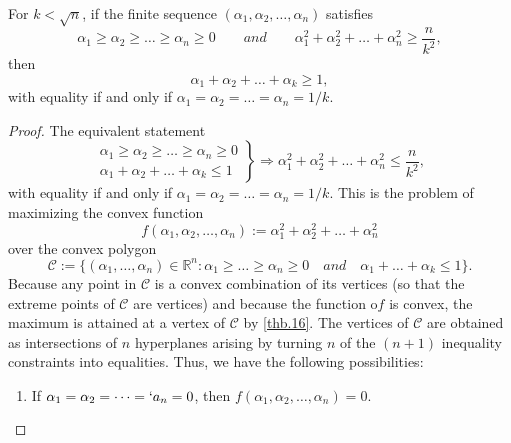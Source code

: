 \begin{lemma}
    For $k<\sqrt{n}$, if the finite sequence $(\alpha_1,\alpha_2,\dots,\alpha_n)$ satisfies 
    \begin{equation*}
        \alpha_1 \geq \alpha_2 \geq \dots \geq \alpha_n \geq 0 \qquad and \qquad \alpha_1^2 + \alpha_2^2 + \dots + \alpha_n^2 \geq \dfrac{n}{k^2},
    \end{equation*}
    then 
    \begin{equation*}
        \alpha_1 + \alpha_2 + \dots + \alpha_k \geq 1,
    \end{equation*}
    with equality if and only if $\alpha_1 = \alpha_2 = \dots = \alpha_n = 1/k$.
    \label{lm1.9}
\end{lemma}
\begin{proof}
    The equivalent statement
    \begin{equation*}
        \left.
        \begin{array}{c}
            \alpha_1 \geq \alpha_2 \geq \dots \geq \alpha_n \geq 0\\
            \alpha_1 + \alpha_2 + \dots +\alpha_k \leq 1
        \end{array}
    \right\} \Longrightarrow \alpha^2_1 + \alpha_2^2 + \dots + \alpha_n^2 \leq \dfrac{n}{k^2},
    \end{equation*}
    with equality if and only if $\alpha_1 = \alpha_2 = \dots = \alpha_n = 1/k$. This is the problem of maximizing the convex function
    \begin{equation*}
        f(\alpha_1, \alpha_2, \dots, \alpha_n) := \alpha_1^2 + \alpha_2^2 + \dots + \alpha_n^2
    \end{equation*}
    over the convex polygon
    \begin{equation*}
        \mathcal{C} := \{(\alpha_1,\dots,\alpha_n) \in \mathbb{R}^n : \alpha_1 \geq \dots \geq \alpha_n \geq 0 \quad and \quad \alpha_1 + \dots + \alpha_k \leq 1\}. 
    \end{equation*}
    Because any point in $\mathcal{C}$ is a convex combination of its vertices (so that the extreme points of $\mathcal{C}$ are vertices) and because the function o$f$ is convex, the maximum is attained at a vertex of $\mathcal{C}$ by \cref{thb.16}. The vertices of $\mathcal{C}$ are obtained as intersections of $n$ hyperplanes arising by turning $n$ of the $(n+1)$ inequality constraints into equalities. Thus, we have the following possibilities:
\begin{enumerate}
    \item If $\alpha_1=\alpha_2=\dots=`a_n=0$, then $f(\alpha_1,\alpha_2,\dots,\alpha_n) = 0$.

\end{enumerate}
\end{proof}
